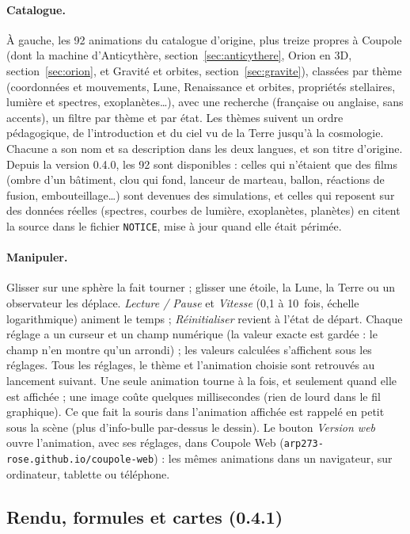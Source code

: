 \paragraph{Catalogue.} À gauche, les 92 animations du catalogue d'origine, plus treize propres à Coupole (dont la machine d'Anticythère, section~\ref{sec:anticythere}, Orion en 3D, section~\ref{sec:orion}, et Gravité et orbites, section~\ref{sec:gravite}), classées par thème (coordonnées et
mouvements, Lune, Renaissance et orbites, propriétés stellaires, lumière et spectres, exoplanètes…), avec une recherche
(française ou anglaise, sans accents), un filtre par thème et par état. Les thèmes suivent un ordre pédagogique, de
l'introduction et du ciel vu de la Terre jusqu'à la cosmologie. Chacune a son nom et sa description dans les
deux langues, et son titre d'origine. Depuis la version 0.4.0, les 92 sont disponibles : celles qui n'étaient que
des films (ombre d'un bâtiment, clou qui fond, lanceur de marteau, ballon, réactions de fusion, embouteillage…) sont
devenues des simulations, et celles qui reposent sur des données réelles (spectres, courbes de lumière, exoplanètes,
planètes) en citent la source dans le fichier \texttt{NOTICE}, mise à jour quand elle était périmée.

\paragraph{Manipuler.} Glisser sur une sphère la fait tourner ; glisser une étoile, la Lune, la Terre ou un
observateur les déplace. \emph{Lecture / Pause} et \emph{Vitesse} (0,1 à 10~fois, échelle logarithmique) animent le
temps ; \emph{Réinitialiser} revient à l'état de départ. Chaque réglage a un curseur et un champ numérique (la valeur
exacte est gardée : le champ n'en montre qu'un arrondi) ; les valeurs calculées s'affichent sous les réglages. Tous
les réglages, le thème et l'animation choisie sont retrouvés au lancement suivant. Une seule animation tourne à la
fois, et seulement quand elle est affichée ; une image coûte quelques millisecondes (rien de lourd dans le fil
graphique). Ce que fait la souris dans l'animation affichée est rappelé en petit sous la scène (plus d'info-bulle
par-dessus le dessin). Le bouton \emph{Version web} ouvre l'animation, avec ses réglages, dans Coupole Web
(\texttt{arp273-rose.github.io/coupole-web}) : les mêmes animations dans un navigateur, sur ordinateur, tablette ou
téléphone.

\subsection{Rendu, formules et cartes (0.4.1)}
